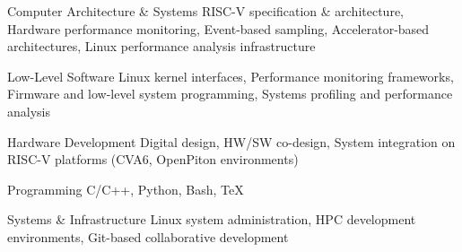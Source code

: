 
\begin{cvskills}

    \cvskill
    {Computer Architecture \& Systems}
    {RISC-V specification \& architecture, Hardware performance monitoring, Event-based sampling, \newline Accelerator-based architectures, Linux performance analysis infrastructure}

    \cvskill
    {Low-Level Software}
    {Linux kernel interfaces, Performance monitoring frameworks, Firmware and low-level system \newline programming, Systems profiling and performance analysis}

    \cvskill
    {Hardware Development}
    {Digital design, HW/SW co-design, System integration on RISC-V platforms (CVA6, OpenPiton \newline environments)}

	\cvskill
	{Programming}
    {C/C++, Python, Bash, \TeX}

    \cvskill
    {Systems \& Infrastructure}
    {Linux system administration, HPC development environments, Git-based collaborative \newline development}









\end{cvskills}
